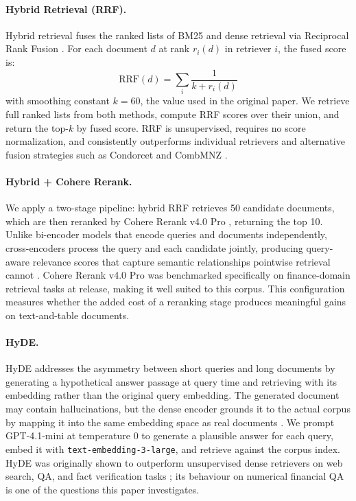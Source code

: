 \documentclass[11pt]{article}
\begin{document}
\paragraph{Hybrid Retrieval (RRF).}
Hybrid retrieval fuses the ranked lists of BM25 and dense retrieval via Reciprocal Rank Fusion \citep{cormack2009rrf}. For each document $d$ at rank $r_i(d)$ in retriever $i$, the fused score is:
\begin{equation}
\text{RRF}(d) = \sum_{i} \frac{1}{k + r_i(d)}
\end{equation}
with smoothing constant $k = 60$, the value used in the original paper. We retrieve full ranked lists from both methods, compute RRF scores over their union, and return the top-$k$ by fused score. RRF is unsupervised, requires no score normalization, and consistently outperforms individual retrievers and alternative fusion strategies such as Condorcet and CombMNZ \citep{cormack2009rrf}.

\paragraph{Hybrid + Cohere Rerank.}
We apply a two-stage pipeline: hybrid RRF retrieves 50 candidate documents, which are then reranked by Cohere Rerank v4.0 Pro \citep{cohere2025rerank4}, returning the top 10. Unlike bi-encoder models that encode queries and documents independently, cross-encoders process the query and each candidate jointly, producing query-aware relevance scores that capture semantic relationships pointwise retrieval cannot \citep{nogueira2019passage}. Cohere Rerank v4.0 Pro was benchmarked specifically on finance-domain retrieval tasks at release, making it well suited to this corpus. This configuration measures whether the added cost of a reranking stage produces meaningful gains on text-and-table documents.

\paragraph{HyDE.}
HyDE \citep{gao2023hyde} addresses the asymmetry between short queries and long documents by generating a hypothetical answer passage at query time and retrieving with its embedding rather than the original query embedding. The generated document may contain hallucinations, but the dense encoder grounds it to the actual corpus by mapping it into the same embedding space as real documents \citep{gao2023hyde}. We prompt GPT-4.1-mini at temperature 0 to generate a plausible answer for each query, embed it with \texttt{text-embedding-3-large}, and retrieve against the corpus index. HyDE was originally shown to outperform unsupervised dense retrievers on web search, QA, and fact verification tasks \citep{gao2023hyde}; its behaviour on numerical financial QA is one of the questions this paper investigates.
\end{document}

